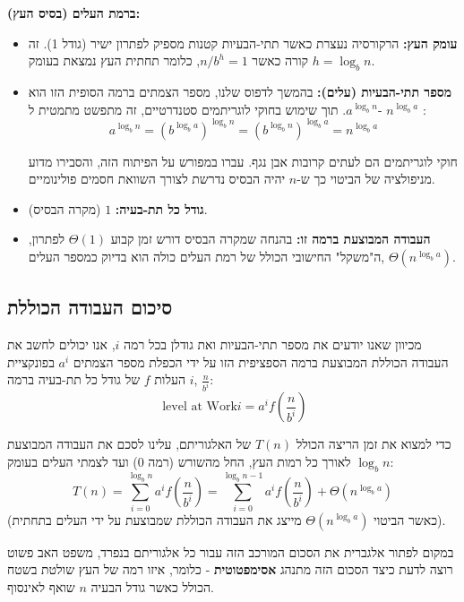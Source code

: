 \documentclass[11pt, a4paper]{article}
\begin{document}
\vspace{0.5cm}
\noindent\textbf{ברמת העלים (בסיס העץ):}
\begin{itemize}
    \item \textbf{עומק העץ:} הרקורסיה נעצרת כאשר תתי-הבעיות קטנות מספיק לפתרון ישיר (גודל 1). זה קורה כאשר $n/b^h= 1$, כלומר תחתית העץ נמצאת בעומק $h = \log_b n$.
    \item \textbf{מספר תתי-הבעיות (עלים):} בהמשך לדפוס שלנו, מספר הצמתים ברמה הסופית הזו הוא $a^{\log_b n}$. תוך שימוש בחוקי לוגריתמים סטנדרטיים, זה מתפשט מתמטית ל- $n^{\log_b a}$ :
        \[ a^{\log_b n} = (b^{\log_b a})^{\log_b n} = (b^{\log_b n})^{\log_b a} = n^{\log_b a} \]

        \begin{educatortip}
        חוקי לוגריתמים הם לעתים קרובות אבן נגף. עברו במפורש על הפיתוח הזה, והסבירו מדוע מניפולציה של הביטוי כך ש-$n$ יהיה הבסיס נדרשת לצורך השוואת חסמים פולינומיים.
        \end{educatortip}

    \item \textbf{גודל כל תת-בעיה:} $1$ (מקרה הבסיס).
    \item \textbf{העבודה המבוצעת ברמה זו:} בהנחה שמקרה הבסיס דורש זמן קבוע $\Theta(1)$ לפתרון, ה"משקל" החישובי הכולל של רמת העלים כולה הוא בדיוק כמספר העלים, $\Theta(n^{\log_b a})$.
\end{itemize}

\subsection*{סיכום העבודה הכוללת} 
מכיוון שאנו יודעים את מספר תתי-הבעיות ואת גודלן בכל רמה $i$, אנו יכולים לחשב את העבודה הכוללת המבוצעת ברמה הספציפית הזו על ידי הכפלת מספר הצמתים $a^i$ בפונקציית העלות $f$ של גודל כל תת-בעיה ברמה $i$, $\frac{n}{b^i}$:
\[
    \text{ level at Work} i = a^i f\left(\frac{n}{b^i}\right)
\]

כדי למצוא את זמן הריצה הכולל $T(n)$ של האלגוריתם, עלינו לסכם את העבודה המבוצעת לאורך כל רמות העץ, החל מהשורש (רמה 0) ועד לצמתי העלים בעומק $\log_b n$:
\begin{equation*}
    T(n) = \sum_{i=0}^{\log_b n} a^i f\left(\frac{n}{b^i}\right) = \sum_{i=0}^{\log_b n - 1} a^i f\left(\frac{n}{b^i}\right) + \Theta(n^{\log_b a})
\end{equation*}
(כאשר הביטוי $\Theta(n^{\log_b a})$ מייצג את העבודה הכוללת שמבוצעת על ידי העלים בתחתית).

במקום לפתור אלגברית את הסכום המורכב הזה עבור כל אלגוריתם בנפרד, משפט האב פשוט רוצה לדעת כיצד הסכום הזה מתנהג \textbf{אסימפטוטית} - כלומר, איזו רמה של העץ שולטת בשטח הכולל כאשר גודל הבעיה $n$ שואף לאינסוף.
\newpage
\end{document}
